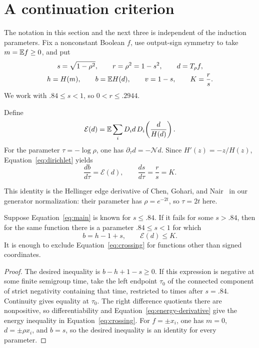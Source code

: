 \section{A continuation criterion}\label{sec:continuation}
The notation in this section and the next three is independent of the induction parameters.
Fix a nonconstant Boolean \(f\), use output-sign symmetry to take \(m=\mathbb E f\ge0\), and put
\begin{equation}\label{eq:continuation-notation}
\begin{gathered}
s=\sqrt{1-\rho^2},\qquad r=\rho^2=1-s^2,\qquad d=T_\rho f,\\
h=H(m),\qquad b=\mathbb E H(d),\qquad v=1-s,\qquad K=\frac rs.
\end{gathered}
\end{equation}
We work with \(.84\le s<1\), so \(0<r\le .2944\).

Define
\begin{equation}\label{eq:energy-definition}
\mathcal E(d)=\mathbb E\sum_i D_i d\,D_i\!\left(\frac{d}{H(d)}\right).
\end{equation}
For the parameter \(\tau=-\log\rho\), one has
\(\partial_\tau d=-\mathcal N d\). Since \(H'(z)=-z/H(z)\),
Equation~\eqref{eq:dirichlet} yields
\begin{equation}\label{eq:energy-derivative}
\frac{db}{d\tau}=\mathcal E(d),
\qquad
\frac{ds}{d\tau}=\frac rs=K.
\end{equation}

This identity is the Hellinger edge derivative of
Chen, Gohari, and Nair~\cite[Section~III, Lemma~6]{HellingerDifferential}
in our generator normalization: their parameter has $\rho=e^{-2t}$,
so $\tau=2t$ here.

\begin{lemma}\label{lem:crossing}
Suppose Equation~\eqref{eq:main} is known for \(s\le .84\).
If it fails for some \(s>.84\), then for the same function there is a parameter
\(.84\le s<1\) for which
\begin{equation}\label{eq:crossing}
b=h-1+s,\qquad \mathcal E(d)\le K.
\end{equation}
It is enough to exclude Equation~\eqref{eq:crossing} for functions other than signed coordinates.
\end{lemma}
\begin{proof}
The desired inequality is \(b-h+1-s\ge0\). If this expression is negative at some finite semigroup time, take the left endpoint \(\tau_0\) of the connected component of strict negativity containing that time, restricted to times after \(s=.84\).
Continuity gives equality at \(\tau_0\).
The right difference quotients there are nonpositive, so differentiability and Equation~\eqref{eq:energy-derivative} give the energy inequality in Equation~\eqref{eq:crossing}.
For \(f=\pm x_i\), one has \(m=0\), \(d=\pm\rho x_i\), and \(b=s\), so the desired inequality is an identity for every parameter.
\end{proof}

